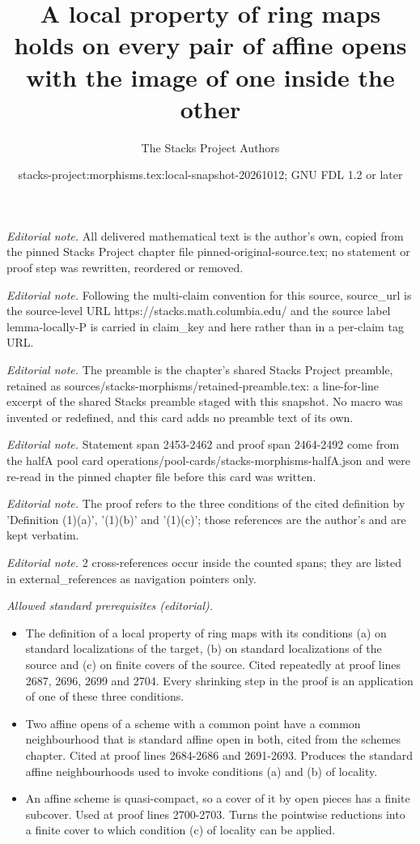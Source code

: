 \documentclass[10pt,a4paper]{amsart}
\title{A local property of ring maps holds on every pair of affine opens with the image of one inside the other}
\author{The Stacks Project Authors}
\date{stacks-project:morphisms.tex:local-snapshot-20261012; GNU FDL 1.2 or later}
\theoremstyle{plain}
\theoremstyle{definition}
\theoremstyle{remark}
\numberwithin{equation}{subsection}
\begin{document}
\maketitle
\noindent\textit{Editorial note.} All delivered mathematical text is the author's own, copied from the pinned Stacks Project chapter file pinned-original-source.tex; no statement or proof step was rewritten, reordered or removed.\par\medskip
\noindent\textit{Editorial note.} Following the multi-claim convention for this source, source\_url is the source-level URL https://stacks.math.columbia.edu/ and the source label lemma-locally-P is carried in claim\_key and here rather than in a per-claim tag URL.\par\medskip
\noindent\textit{Editorial note.} The preamble is the chapter's shared Stacks Project preamble, retained as sources/stacks-morphisms/retained-preamble.tex: a line-for-line excerpt of the shared Stacks preamble staged with this snapshot. No macro was invented or redefined, and this card adds no preamble text of its own.\par\medskip
\noindent\textit{Editorial note.} Statement span 2453-2462 and proof span 2464-2492 come from the halfA pool card operations/pool-cards/stacks-morphisms-halfA.json and were re-read in the pinned chapter file before this card was written.\par\medskip
\noindent\textit{Editorial note.} The proof refers to the three conditions of the cited definition by 'Definition (1)(a)', '(1)(b)' and '(1)(c)'; those references are the author's and are kept verbatim.\par\medskip
\noindent\textit{Editorial note.} 2 cross-references occur inside the counted spans; they are listed in external\_references as navigation pointers only.\par\medskip
\noindent\textit{Allowed standard prerequisites (editorial).}\begin{itemize}
\item The definition of a local property of ring maps with its conditions (a) on standard localizations of the target, (b) on standard localizations of the source and (c) on finite covers of the source. Cited repeatedly at proof lines 2687, 2696, 2699 and 2704. Every shrinking step in the proof is an application of one of these three conditions.
\item Two affine opens of a scheme with a common point have a common neighbourhood that is standard affine open in both, cited from the schemes chapter. Cited at proof lines 2684-2686 and 2691-2693. Produces the standard affine neighbourhoods used to invoke conditions (a) and (b) of locality.
\item An affine scheme is quasi-compact, so a cover of it by open pieces has a finite subcover. Used at proof lines 2700-2703. Turns the pointwise reductions into a finite cover to which condition (c) of locality can be applied.
\end{itemize}\medskip
\end{document}
